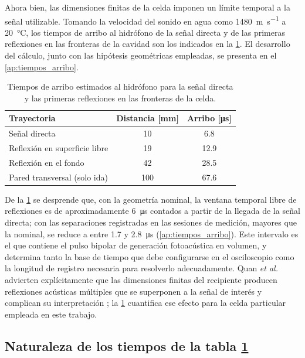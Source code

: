Ahora bien, las dimensiones finitas de la celda imponen un límite
temporal a la señal utilizable. Tomando la velocidad del sonido en
agua como \SI{1480}{\meter\per\second} a \SI{20}{\celsius}, los
tiempos de arribo al hidrófono de la señal directa y de las primeras
reflexiones en las fronteras de la cavidad son los indicados en la
\cref{tab:tiempos_celda}. El desarrollo del cálculo, junto con las
hipótesis geométricas empleadas, se presenta en el
\cref{ap:tiempos_arribo}.

\begin{table}[H]
  \centering
  \caption{Tiempos de arribo estimados al hidrófono para la señal
           directa y las primeras reflexiones en las fronteras de la
           celda.}
  \label{tab:tiempos_celda}
  \begin{tabular}{lcc}
    \toprule
    \textbf{Trayectoria} & \textbf{Distancia [\si{\milli\meter}]}
    & \textbf{Arribo [\si{\micro\second}]} \\
    \midrule
    Señal directa                      &  10 &  6.8 \\
    Reflexión en superficie libre      &  19 & 12.9 \\
    Reflexión en el fondo              &  42 & 28.5 \\
    Pared transversal (solo ida)       & 100 & 67.6 \\
    \bottomrule
  \end{tabular}
\end{table}

De la \cref{tab:tiempos_celda} se desprende que, con la geometría
nominal, la ventana temporal libre de reflexiones es de aproximadamente
\SI{6}{\micro\second} contados a partir de la llegada de la señal
directa; con las separaciones registradas en las sesiones de medición,
mayores que la nominal, se reduce a entre 1.7 y
\SI{2.8}{\micro\second} (\cref{ap:tiempos_arribo}). Este intervalo
es el que contiene el pulso bipolar de generación fotoacústica en
volumen, y determina tanto la base de tiempo que debe configurarse
en el osciloscopio como la longitud de registro necesaria para
resolverlo adecuadamente. Quan \textit{et al.} advierten
explícitamente que las dimensiones finitas del recipiente producen
reflexiones acústicas múltiples que se superponen a la señal de
interés y complican su interpretación \cite{Quan1994}; la
\cref{tab:tiempos_celda} cuantifica ese efecto para la celda
particular empleada en este trabajo.

\subsection*{Naturaleza de los tiempos de la tabla \ref{tab:tiempos_celda}}
\label{sec:origen_tiempos}

